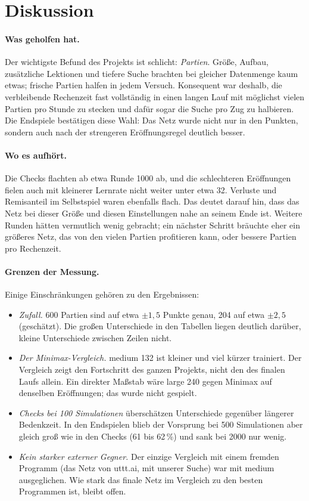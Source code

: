 \documentclass[11pt,a4paper]{article}
\begin{document}
\section{Diskussion}
\label{sec:diskussion}

\paragraph{Was geholfen hat.} Der wichtigste Befund des Projekts ist schlicht: \emph{Partien}. Größe,
Aufbau, zusätzliche Lektionen und tiefere Suche brachten bei gleicher Datenmenge kaum etwas; frische
Partien halfen in jedem Versuch. Konsequent war deshalb, die verbleibende Rechenzeit fast vollständig in
einen langen Lauf mit möglichst vielen Partien pro Stunde zu stecken und dafür sogar die Suche pro Zug zu
halbieren. Die Endspiele bestätigen diese Wahl: Das Netz wurde nicht nur in den Punkten, sondern auch nach
der strengeren Eröffnungsregel deutlich besser.

\paragraph{Wo es aufhört.} Die Checks flachten ab etwa Runde 1000 ab, und die schlechteren Eröffnungen
fielen auch mit kleinerer Lernrate nicht weiter unter etwa 32. Verluste und Remisanteil im Selbstspiel
waren ebenfalls flach. Das deutet darauf hin, dass das Netz bei dieser Größe und diesen Einstellungen nahe
an seinem Ende ist. Weitere Runden hätten vermutlich wenig gebracht; ein nächster Schritt bräuchte eher
ein größeres Netz, das von den vielen Partien profitieren kann, oder bessere Partien pro Rechenzeit.

\paragraph{Grenzen der Messung.} Einige Einschränkungen gehören zu den Ergebnissen:
\begin{itemize}
\item \emph{Zufall.} 600 Partien sind auf etwa $\pm1{,}5$ Punkte genau, 204 auf etwa $\pm2{,}5$ (geschätzt).
Die großen Unterschiede in den Tabellen liegen deutlich darüber, kleine Unterschiede zwischen Zeilen nicht.
\item \emph{Der Minimax-Vergleich.} medium 132 ist kleiner und viel kürzer trainiert. Der Vergleich zeigt den
Fortschritt des ganzen Projekts, nicht den des finalen Laufs allein. Ein direkter Maßstab wäre large 240
gegen Minimax auf denselben Eröffnungen; das wurde nicht gespielt.
\item \emph{Checks bei 100 Simulationen} überschätzen Unterschiede gegenüber längerer Bedenkzeit. In den
Endspielen blieb der Vorsprung bei 500 Simulationen aber gleich groß wie in den Checks (61 bis 62\,\%) und
sank bei 2000 nur wenig.
\item \emph{Kein starker externer Gegner.} Der einzige Vergleich mit einem fremden Programm (das Netz von
uttt.ai, mit unserer Suche) war mit medium ausgeglichen. Wie stark das finale Netz im Vergleich zu den
besten Programmen ist, bleibt offen.
\end{itemize}
\end{document}
